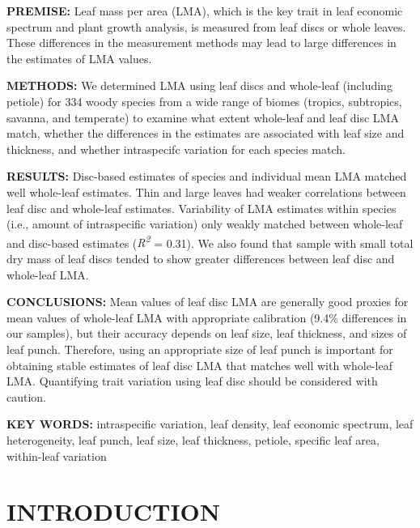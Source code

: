 \documentclass[
  12pt,
  a4paper,
,tablecaptionabove
]{scrartcl}
\begin{document}
\textbf{PREMISE:} Leaf mass per area (LMA), which is the key trait in
leaf economic spectrum and plant growth analysis, is measured from leaf
discs or whole leaves. These differences in the measurement methods may
lead to large differences in the estimates of LMA values.

\textbf{METHODS:} We determined LMA using leaf discs and whole-leaf
(including petiole) for 334 woody species from a wide range of biomes
(tropics, subtropics, savanna, and temperate) to examine what extent
whole-leaf and leaf disc LMA match, whether the differences in the
estimates are associated with leaf size and thickness, and whether
intraspecifc variation for each species match.

\textbf{RESULTS:} Disc-based estimates of species and individual mean
LMA matched well whole-leaf estimates. Thin and large leaves had weaker
correlations between leaf disc and whole-leaf estimates. Variability of
LMA estimates within species (i.e., amount of intraspecific variation)
only weakly matched between whole-leaf and disc-based estimates
(\emph{R\textsuperscript{2}} = 0.31). We also found that sample with
small total dry mass of leaf discs tended to show greater differences
between leaf disc and whole-leaf LMA.

\textbf{CONCLUSIONS:} Mean values of leaf disc LMA are generally good
proxies for mean values of whole-leaf LMA with appropriate calibration
(9.4\% differences in our samples), but their accuracy depends on leaf
size, leaf thickness, and sizes of leaf punch. Therefore, using an
appropriate size of leaf punch is important for obtaining stable
estimates of leaf disc LMA that matches well with whole-leaf LMA.
Quantifying trait variation using leaf disc should be considered with
caution.

\textbf{KEY WORDS:} intraspecific variation, leaf density, leaf economic
spectrum, leaf heterogeneity, leaf punch, leaf size, leaf thickness,
petiole, specific leaf area, within-leaf variation

\hypertarget{introduction}{%
\section{INTRODUCTION}\label{introduction}}
\end{document}
